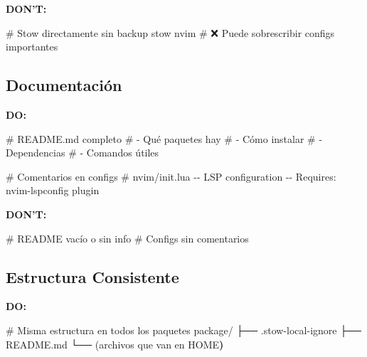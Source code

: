\documentclass[
  doc,
  floatsintext,
  longtable,
  a4paper,
  nolmodern,
  notxfonts,
  notimes,
  12pt,
  colorlinks=true,linkcolor=blue,citecolor=blue,urlcolor=blue]{apa7}
\newenvironment{Shaded}{\begin{snugshade}}{\end{snugshade}}
\newcommand{\CommentTok}[1]{\textcolor[rgb]{0.37,0.37,0.37}{#1}}
\newcommand{\ErrorTok}[1]{\textcolor[rgb]{0.68,0.00,0.00}{#1}}
\newcommand{\ExtensionTok}[1]{\textcolor[rgb]{0.00,0.23,0.31}{#1}}
\newcommand{\KeywordTok}[1]{\textcolor[rgb]{0.00,0.23,0.31}{\textbf{#1}}}
\newcommand{\NormalTok}[1]{\textcolor[rgb]{0.00,0.23,0.31}{#1}}
\begin{document}
\textbf{DON'T:}

\begin{Shaded}
\begin{Highlighting}[]
\CommentTok{\# Stow directamente sin backup}
\ExtensionTok{stow}\NormalTok{ nvim  }\CommentTok{\# ❌ Puede sobrescribir configs importantes}
\end{Highlighting}
\end{Shaded}

\subsection{Documentación}\label{documentaciuxf3n}

\textbf{DO:}

\begin{Shaded}
\begin{Highlighting}[]
\CommentTok{\# README.md completo}
\CommentTok{\# {-} Qué paquetes hay}
\CommentTok{\# {-} Cómo instalar}
\CommentTok{\# {-} Dependencias}
\CommentTok{\# {-} Comandos útiles}

\CommentTok{\# Comentarios en configs}
\CommentTok{\# nvim/init.lua}
\ExtensionTok{{-}{-}}\NormalTok{ LSP configuration}
\ExtensionTok{{-}{-}}\NormalTok{ Requires: nvim{-}lspconfig plugin}
\end{Highlighting}
\end{Shaded}

\textbf{DON'T:}

\begin{Shaded}
\begin{Highlighting}[]
\CommentTok{\# README vacío o sin info}
\CommentTok{\# Configs sin comentarios}
\end{Highlighting}
\end{Shaded}

\subsection{Estructura Consistente}\label{estructura-consistente}

\textbf{DO:}

\begin{Shaded}
\begin{Highlighting}[]
\CommentTok{\# Misma estructura en todos los paquetes}
\ExtensionTok{package/}
  \ExtensionTok{├──}\NormalTok{ .stow{-}local{-}ignore}
  \ExtensionTok{├──}\NormalTok{ README.md}
  \ExtensionTok{└──} \ErrorTok{(}\ExtensionTok{archivos}\NormalTok{ que van en HOME}\KeywordTok{)}
\end{Highlighting}
\end{Shaded}
\end{document}
